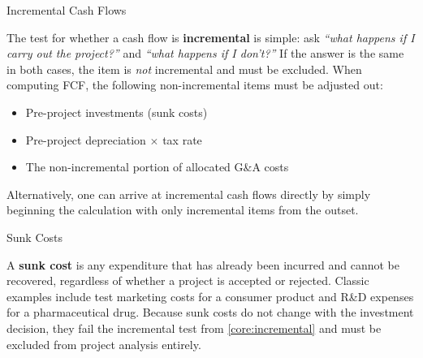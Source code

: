 \documentclass[10pt]{article}
\begin{document}
    \begin{core}[label=core:incremental]{Incremental Cash Flows}

      The test for whether a cash flow is \textbf{incremental} is simple: ask \textit{``what happens if I carry out the project?''} and \textit{``what happens if I don't?''} If the answer is the same in both cases, the item is \textit{not} incremental and must be excluded. When computing FCF, the following non-incremental items must be adjusted out:

      \begin{itemize}

        \item Pre-project investments (sunk costs)

        \item Pre-project depreciation $\times$ tax rate

        \item The non-incremental portion of allocated G\&A costs

      \end{itemize}

      Alternatively, one can arrive at incremental cash flows directly by simply beginning the calculation with only incremental items from the outset.


    \end{core}

    \begin{core}{Sunk Costs}

      A \textbf{sunk cost} is any expenditure that has already been incurred and cannot be recovered, regardless of whether a project is accepted or rejected. Classic examples include test marketing costs for a consumer product and R\&D expenses for a pharmaceutical drug. Because sunk costs do not change with the investment decision, they fail the incremental test from \autoref{core:incremental} and must be excluded from project analysis entirely.


    \end{core}
\end{document}
